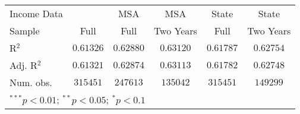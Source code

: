 \begin{tabular}{l c c c c c}
Income Data          &                  & MSA              & MSA              & State            & State            \\
Sample               & Full             & Full             & Two Years        & Full             & Two Years        \\
R$^2$                & $0.61326$        & $0.62880$        & $0.63120$        & $0.61787$        & $0.62754$        \\
Adj. R$^2$           & $0.61321$        & $0.62874$        & $0.63113$        & $0.61782$        & $0.62748$        \\
Num. obs.            & $315451$         & $247613$         & $135042$         & $315451$         & $149299$         \\
\hline
\multicolumn{6}{l}{\scriptsize{$^{***}p<0.01$; $^{**}p<0.05$; $^{*}p<0.1$}}
\end{tabular}
